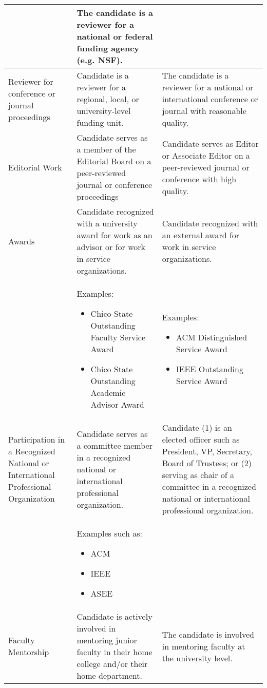 \documentclass{scrartcl}
\begin{document}
\begin{longtable}{p{3cm}p{5.5cm}P{5.5cm}}
 & The candidate is a reviewer for a national or federal funding agency (e.g. NSF).\\ 
 \hline
  Reviewer for conference or journal proceedings
 & Candidate is a reviewer for a regional, local, or
university-level funding unit.%
 & The candidate is a reviewer for
a national or international
conference or journal with
reasonable quality.\\ 
 \hline
   Editorial Work
 & Candidate serves as a member of the Editorial Board on a peer-reviewed journal or conference proceedings%
 & Candidate serves as Editor or Associate Editor on a
peer-reviewed journal or conference with high quality.
\\ 
 \hline
 Awards & Candidate recognized with a university award for work as an advisor or for work in service organizations. & Candidate recognized with an external award for work in service organizations.\\
 &
 Examples:
	\begin{itemize}[noitemsep,leftmargin=*,topsep=0pt,partopsep=0pt]
    \item Chico State Outstanding Faculty Service Award
    \item Chico State Outstanding Academic Advisor Award
	\end{itemize}
  & %
  Examples:
    \begin{itemize}[noitemsep,leftmargin=*,topsep=0pt,partopsep=0pt]
        \item ACM Distinguished Service Award
        \item IEEE Outstanding Service Award
    \end{itemize}\\ 
\hline
 Participation in a Recognized National or International Professional Organization & Candidate serves as a committee member in a recognized national or international professional organization.& Candidate (1) is an elected officer such as President, VP, Secretary, Board of Trustees; or (2) serving as chair of a committee in a recognized national or international professional organization.\\
 &
 Examples such as:
	\begin{itemize}[noitemsep,leftmargin=*,topsep=0pt,partopsep=0pt]
    \item ACM
    \item IEEE
    \item ASEE
	\end{itemize}
  &\\ 
\hline
 Faculty Mentorship & Candidate is actively involved in mentoring junior faculty in their home college and/or their home department.& The candidate is involved in mentoring faculty at the university level. \\

\end{longtable}
\end{document}
